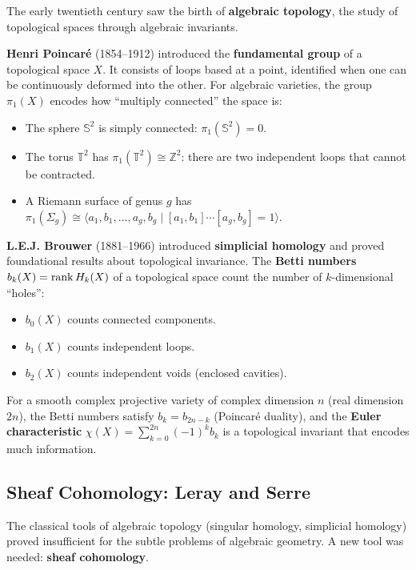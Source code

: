 The early twentieth century saw the birth of \textbf{algebraic topology}, the study of topological spaces through algebraic invariants.

\textbf{Henri Poincar\'e} (1854--1912) introduced the \textbf{fundamental group} of a topological space $X$. It consists of loops based at a point, identified when one can be continuously deformed into the other. For algebraic varieties, the group $\pi_1(X)$ encodes how ``multiply connected'' the space is:
\begin{itemize}
    \item The sphere $\mathbb{S}^2$ is simply connected: $\pi_1(\mathbb{S}^2) = 0$.
    \item The torus $\mathbb{T}^2$ has $\pi_1(\mathbb{T}^2) \cong \mathbb{Z}^2$: there are two independent loops that cannot be contracted.
    \item A Riemann surface of genus $g$ has $\pi_1(\Sigma_g) \cong \langle a_1, b_1, \ldots, a_g, b_g \mid [a_1, b_1] \cdots [a_g, b_g] = 1 \rangle$.
\end{itemize}

\textbf{L.E.J. Brouwer} (1881--1966) introduced \textbf{simplicial homology} and proved foundational results about topological invariance. The \textbf{Betti numbers} $b_k(X) = \operatorname{rank} H_k(X)$ of a topological space count the number of $k$-dimensional ``holes'':
\begin{itemize}
    \item $b_0(X)$ counts connected components.
    \item $b_1(X)$ counts independent loops.
    \item $b_2(X)$ counts independent voids (enclosed cavities).
\end{itemize}

For a smooth complex projective variety of complex dimension $n$ (real dimension $2n$), the Betti numbers satisfy $b_k = b_{2n-k}$ (Poincar\'e duality), and the \textbf{Euler characteristic} $\chi(X) = \sum_{k=0}^{2n} (-1)^k b_k$ is a topological invariant that encodes much information.

\subsection{Sheaf Cohomology: Leray and Serre}

The classical tools of algebraic topology (singular homology, simplicial homology) proved insufficient for the subtle problems of algebraic geometry. A new tool was needed: \textbf{sheaf cohomology}.

